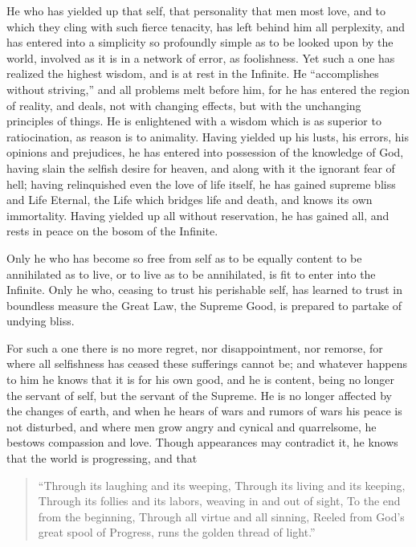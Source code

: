 \documentclass[12pt,oneside]{scrbook}
\begin{document}
  He who has yielded up that self, that personality that men most love,
  and to which they cling with such fierce tenacity, has left behind him
  all perplexity, and has entered into a simplicity so profoundly simple
  as to be looked upon by the world, involved as it is in a network of
  error, as foolishness. Yet such a one has realized the highest wisdom,
  and is at rest in the Infinite. He ``accomplishes without striving,''
  and all problems melt before him, for he has entered the region of
  reality, and deals, not with changing effects, but with the unchanging
  principles of things. He is enlightened with a wisdom which is as
  superior to ratiocination, as reason is to animality. Having yielded up
  his lusts, his errors, his opinions and prejudices, he has entered into
  possession of the knowledge of God, having slain the selfish desire for
  heaven, and along with it the ignorant fear of hell; having relinquished
  even the love of life itself, he has gained supreme bliss and Life
  Eternal, the Life which bridges life and death, and knows its own
  immortality. Having yielded up all without reservation, he has gained
  all, and rests in peace on the bosom of the Infinite.
  
  Only he who has become so free from self as to be equally content to be
  annihilated as to live, or to live as to be annihilated, is fit to enter
  into the Infinite. Only he who, ceasing to trust his perishable self,
  has learned to trust in boundless measure the Great Law, the Supreme
  Good, is prepared to partake of undying bliss.
  
  For such a one there is no more regret, nor disappointment, nor remorse,
  for where all selfishness has ceased these sufferings cannot be; and
  whatever happens to him he knows that it is for his own good, and he is
  content, being no longer the servant of self, but the servant of the
  Supreme. He is no longer affected by the changes of earth, and when he
  hears of wars and rumors of wars his peace is not disturbed, and where
  men grow angry and cynical and quarrelsome, he bestows compassion and
  love. Though appearances may contradict it, he knows that the world is
  progressing, and that
  
  \begin{quote}
  ``Through its laughing and its weeping, Through its living and its
  keeping, Through its follies and its labors, weaving in and out of
  sight, To the end from the beginning, Through all virtue and all
  sinning, Reeled from God's great spool of Progress, runs the golden
  thread of light.''
  \end{quote}
  
\end{document}
